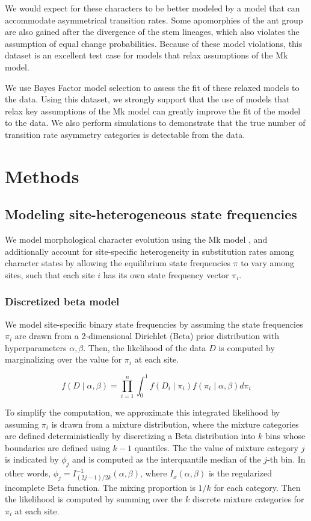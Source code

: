 \documentclass[]{article}
\begin{document}
We would expect for these characters to be better modeled by a model that can accommodate asymmetrical transition rates.
Some apomorphies of the ant group are also gained after the divergence of the stem lineages, which also violates the assumption of equal change probabilities.
Because of these model violations, this dataset is an excellent test case for models that relax assumptions of the Mk model. \par
We use Bayes Factor model selection to assess the fit of these relaxed models to the data.
Using this dataset, we strongly support that the use of models that relax key assumptions of the Mk model can greatly improve the fit of the model to the data.
We also perform simulations to demonstrate that the true number of transition rate asymmetry categories is detectable from the data.

\section{Methods}

\subsection{Modeling site-heterogeneous state frequencies}

We model morphological character evolution using the Mk model \citep{lewis2001likelihood}, and additionally account for site-specific heterogeneity in substitution rates among character states by allowing the equilibrium state frequencies $\pi$ to vary among sites, such that each site $i$ has its own state frequency vector $\pi_i$.

\subsubsection{Discretized beta model}
We model site-specific binary state frequencies by assuming the state frequencies $\pi_i$ are drawn from a 2-dimensional Dirichlet (Beta) prior distribution with hyperparameters $\alpha,\beta$.
Then, the likelihood of the data $D$ is computed by marginalizing over the value for $\pi_i$ at each site.

\begin{equation} \label{continuous-likelihood}
f(D\mid \alpha,\beta) = \prod_{i=1}^n\int_0^1 f(D_i \mid \pi_i)f(\pi_i \mid \alpha,\beta)d\pi_i
\end{equation}

To simplify the computation, we approximate this integrated likelihood by assuming $\pi_i$ is drawn from a mixture distribution, where the mixture categories are defined deterministically by discretizing a Beta distribution into $k$ bins whose boundaries are defined using $k-1$ quantiles.
The the value of mixture category $j$ is indicated by $\phi_j$ and is computed as the interquantile median of the $j$-th bin.
In other words, $\phi_j = I^{-1}_{(2j-1)/2k}(\alpha,\beta)$, where $I_x(\alpha,\beta)$ is the regularized incomplete Beta function.
The mixing proportion is $1/k$ for each category.
Then the likelihood is computed by summing over the $k$ discrete mixture categories for $\pi_i$ at each site.
\end{document}
